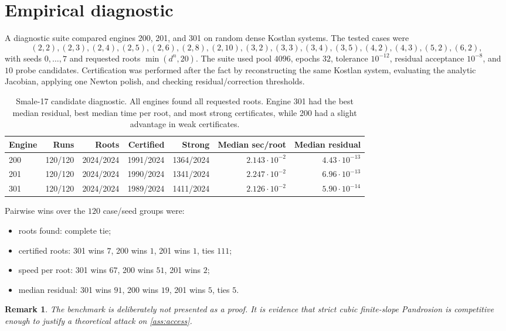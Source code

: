 \documentclass[11pt]{article}
\newtheorem{remark}[definition]{Remark}
\begin{document}
\section{Empirical diagnostic}

A diagnostic suite compared engines 200, 201, and 301 on random dense Kostlan systems.  The tested cases were
\[
(2,2),(2,3),(2,4),(2,5),(2,6),(2,8),(2,10),
(3,2),(3,3),(3,4),(3,5),(4,2),(4,3),(5,2),(6,2),
\]
with seeds $0,\ldots,7$ and requested roots $\min(d^n,20)$.  The suite used pool $4096$, epochs $32$, tolerance $10^{-12}$, residual acceptance $10^{-8}$, and $10$ probe candidates.  Certification was performed after the fact by reconstructing the same Kostlan system, evaluating the analytic Jacobian, applying one Newton polish, and checking residual/correction thresholds.

\begin{table}[h]
\centering
\begin{tabular}{lrrrrrr}
\toprule
Engine & Runs & Roots & Certified & Strong & Median sec/root & Median residual\\
\midrule
200 & 120/120 & 2024/2024 & 1991/2024 & 1364/2024 & $2.143\cdot10^{-2}$ & $4.43\cdot10^{-13}$\\
201 & 120/120 & 2024/2024 & 1990/2024 & 1341/2024 & $2.247\cdot10^{-2}$ & $6.96\cdot10^{-13}$\\
301 & 120/120 & 2024/2024 & 1989/2024 & 1411/2024 & $2.126\cdot10^{-2}$ & $5.90\cdot10^{-14}$\\
\bottomrule
\end{tabular}
\caption{Smale-17 candidate diagnostic.  All engines found all requested roots.  Engine 301 had the best median residual, best median time per root, and most strong certificates, while 200 had a slight advantage in weak certificates.}
\label{tab:diagnostic}
\end{table}

Pairwise wins over the $120$ case/seed groups were:
\begin{itemize}
\item roots found: complete tie;
\item certified roots: 301 wins $7$, 200 wins $1$, 201 wins $1$, ties $111$;
\item speed per root: 301 wins $67$, 200 wins $51$, 201 wins $2$;
\item median residual: 301 wins $91$, 200 wins $19$, 201 wins $5$, ties $5$.
\end{itemize}

\begin{remark}
The benchmark is deliberately not presented as a proof.  It is evidence that strict cubic finite-slope Pandrosion is competitive enough to justify a theoretical attack on \cref{ass:access}.
\end{remark}
\end{document}
